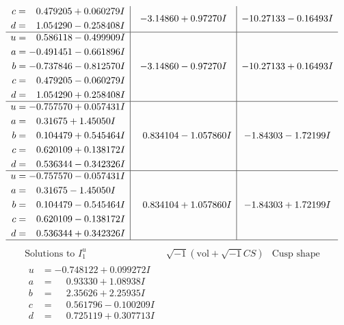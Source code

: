 \documentclass[1p]{elsarticle_modified}
\theoremstyle{definition}
\newcommand{\I}{\sqrt{-1}}
\begin{document}
$$\begin{array}{c|c|c}
\begin{aligned}
c &= \phantom{-}0.479205 + 0.060279 I \\
d &= \phantom{-}1.054290 - 0.258408 I\end{aligned}
 & -3.14860 + 0.97270 I & -10.27133 - 0.16493 I \\ \hline\begin{aligned}
u &= \phantom{-}0.586118 - 0.499909 I \\
a &= -0.491451 - 0.661896 I \\
b &= -0.737846 - 0.812570 I \\
c &= \phantom{-}0.479205 - 0.060279 I \\
d &= \phantom{-}1.054290 + 0.258408 I\end{aligned}
 & -3.14860 - 0.97270 I & -10.27133 + 0.16493 I \\ \hline\begin{aligned}
u &= -0.757570 + 0.057431 I \\
a &= \phantom{-}0.31675 + 1.45050 I \\
b &= \phantom{-}0.104479 + 0.545464 I \\
c &= \phantom{-}0.620109 + 0.138172 I \\
d &= \phantom{-}0.536344 - 0.342326 I\end{aligned}
 & \phantom{-}0.834104 - 1.057860 I & -1.84303 - 1.72199 I \\ \hline\begin{aligned}
u &= -0.757570 - 0.057431 I \\
a &= \phantom{-}0.31675 - 1.45050 I \\
b &= \phantom{-}0.104479 - 0.545464 I \\
c &= \phantom{-}0.620109 - 0.138172 I \\
d &= \phantom{-}0.536344 + 0.342326 I\end{aligned}
 & \phantom{-}0.834104 + 1.057860 I & -1.84303 + 1.72199 I\\
 \hline 
 \end{array}$$\newpage$$\begin{array}{c|c|c}  
\text{Solutions to }I^u_{1}& \I (\text{vol} + \sqrt{-1}CS) & \text{Cusp shape}\\
 \hline 
\begin{aligned}
u &= -0.748122 + 0.099272 I \\
a &= \phantom{-}0.93330 + 1.08938 I \\
b &= \phantom{-}2.35626 + 2.25935 I \\
c &= \phantom{-}0.561796 - 0.100209 I \\
d &= \phantom{-}0.725119 + 0.307713 I\end{aligned}

\end{array}$$
\end{document}

